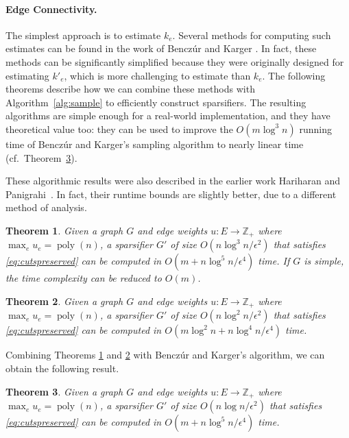 \documentclass[11pt]{article}
\numberwithin{equation}{section}
\newtheorem{theorem}{Theorem}[section]
\newcommand{\bZ}{\mathbb{Z}}
\newcommand{\poly}{\operatorname{poly}}
\newcommand{\Algorithm}[1]{Algorithm~\ref{alg:#1}}
\newcommand{\Theorem}[1]{Theorem~\ref{thm:#1}}
\begin{document}
\paragraph{Edge Connectivity.}
The simplest approach is to estimate $k_e$.
Several methods for computing such estimates can be found
in the work of Bencz\'ur and Karger \cite{BK}.
In fact, these methods can be significantly simplified
because they were originally designed for estimating $k'_e$,
which is more challenging to estimate than $k_e$.
The following theorems describe how we can combine these methods with \Algorithm{sample}
to efficiently construct sparsifiers.
The resulting algorithms are simple enough for a real-world implementation,
and they have theoretical value too:
they can be used to improve the $O(m\log^3n)$ running time of 
Bencz\'ur and Karger's sampling algorithm to nearly linear time (cf.~\Theorem{alg3}).

These algorithmic results were also described in the earlier work Hariharan and Panigrahi~\cite{HP}.
In fact, their runtime bounds are slightly better, due to a different method of analysis.

\begin{theorem}
\label{thm:alg1}
Given a graph $G$ and edge weights $u : E \rightarrow \bZ_+$
where $\max_e u_e = \poly(n)$, 
a sparsifier $G'$ of size $O(n\log^3n/\epsilon^2)$
that satisfies \eqref{eq:cutspreserved} can be computed in $O(m+n\log^5n/\epsilon^4)$ time.
If $G$ is simple, the time complexity can be reduced to $O(m)$.
\end{theorem}

\begin{theorem}
\label{thm:alg2}
Given a graph $G$ and edge weights $u : E \rightarrow \bZ_+$
where $\max_e u_e = \poly(n)$, 
a sparsifier $G'$ of size $O(n\log^2n/\epsilon^2)$
that satisfies \eqref{eq:cutspreserved} can be computed in $O(m\log^2n+n\log^4 n/\epsilon^4)$ time.
\end{theorem}

Combining Theorems \ref{thm:alg1} and \ref{thm:alg2}
with Bencz\'ur and Karger's algorithm, we can obtain the following result.

\begin{theorem}
\label{thm:alg3}
Given a graph $G$ and edge weights $u : E \rightarrow \bZ_+$
where $\max_e u_e = \poly(n)$,
a sparsifier $G'$ of size $O(n\log n/\epsilon^2)$
that satisfies \eqref{eq:cutspreserved} can be computed in $O(m+n\log^5n/\epsilon^4)$ time.
\end{theorem}
\end{document}
